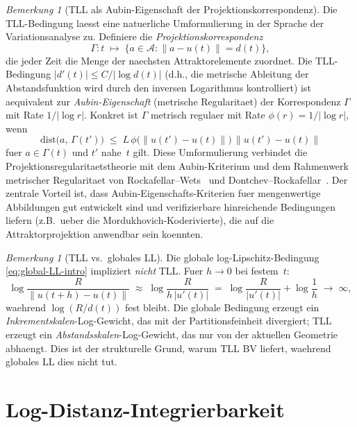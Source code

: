 \documentclass[12pt,a4paper]{article}
\theoremstyle{definition}
\theoremstyle{plain}
\theoremstyle{remark}
\newtheorem{remark}[definition]{Bemerkung}
\newcommand{\dist}{\mathrm{dist}}
\begin{document}
\begin{remark}[TLL als Aubin-Eigenschaft der Projektionskorrespondenz]
\label{rem:TLL-Aubin}
Die TLL-Bedingung laesst eine natuerliche Umformulierung in der
Sprache der Variationsanalyse zu.  Definiere die
\emph{Projektionskorrespondenz}
\[
  \Gamma: t \;\mapsto\;
  \bigl\{a \in \mathcal{A} : \|a - u(t)\| = d(t)\bigr\},
\]
die jeder Zeit die Menge der naechsten Attraktorelemente zuordnet.
Die TLL-Bedingung $|d'(t)| \le C/|\log d(t)|$
(d.h., die metrische Ableitung der Abstandsfunktion wird durch den
inversen Logarithmus kontrolliert) ist aequivalent zur
\emph{Aubin-Eigenschaft} (metrische Regularitaet) der Korrespondenz
$\Gamma$ mit Rate $1/|\log r|$.  Konkret ist $\Gamma$
metrisch regulaer mit Rate $\phi(r) = 1/|\log r|$, wenn
\[
  \dist\bigl(a,\, \Gamma(t')\bigr)
  \;\le\;
  L\,\phi\bigl(\|u(t') - u(t)\|\bigr)\,\|u(t') - u(t)\|
\]
fuer $a \in \Gamma(t)$ und $t'$ nahe~$t$ gilt.
Diese Umformulierung verbindet die Projektionsregularitaetstheorie
mit dem Aubin-Kriterium und dem Rahmenwerk metrischer Regularitaet
von Rockafellar--Wets~\cite{RockafellarWets1998} und
Dontchev--Rockafellar~\cite{DontchevRockafellar2009}.
Der zentrale Vorteil ist, dass Aubin-Eigenschafts-Kriterien fuer
mengenwertige Abbildungen gut entwickelt sind und verifizierbare
hinreichende Bedingungen liefern (z.B.\ ueber die
Mordukhovich-Koderivierte), die auf die Attraktorprojektion
anwendbar sein koennten.
\end{remark}

\begin{remark}[TLL vs.\ globales LL]
\label{rem:TLL-vs-LL}
Die globale log-Lipschitz-Bedingung \eqref{eq:global-LL-intro}
impliziert \emph{nicht} TLL.  Fuer $h \to 0$ bei festem~$t$:
\[
  \log\frac{R}{\|u(t+h)-u(t)\|}
  \;\approx\;
  \log\frac{R}{h\,|u'(t)|}
  \;=\;
  \log\frac{R}{|u'(t)|} + \log\frac{1}{h}
  \;\to\; \infty,
\]
waehrend $\log(R/d(t))$ fest bleibt.  Die globale Bedingung
erzeugt ein \emph{Inkrementskalen}-Log-Gewicht, das mit der
Partitionsfeinheit divergiert; TLL erzeugt ein
\emph{Abstandsskalen}-Log-Gewicht, das nur von der aktuellen
Geometrie abhaengt.  Dies ist der strukturelle Grund, warum TLL
BV liefert, waehrend globales LL dies nicht tut.
\end{remark}


\section{Log-Distanz-Integrierbarkeit}
\label{sec:LDI}
\end{document}
